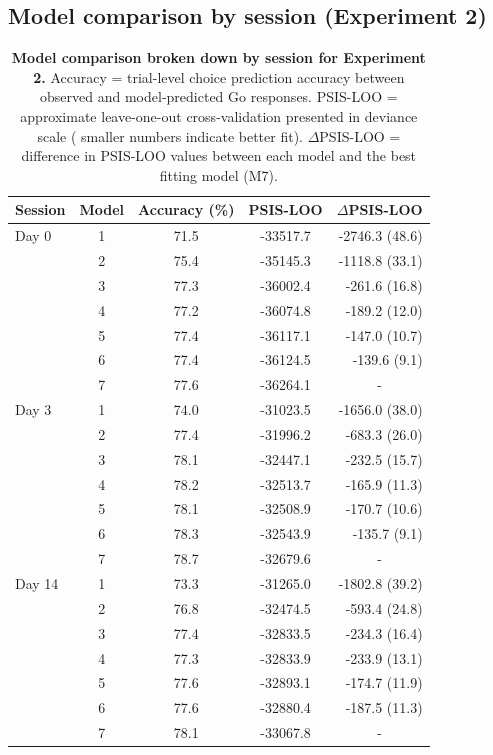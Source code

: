\documentclass[a4paper,12pt]{article}
\begin{document}
\begin{refsection}[supp]
\clearpage
\subsection*{Model comparison by session (Experiment 2)}

\begin{table}[h]
    \centering
    \begin{tabular}{lcccr}
        \toprule
        Session & Model & Accuracy (\%) & PSIS-LOO & \multicolumn{1}{c}{$\Delta$PSIS-LOO} \\
        \midrule
         Day 0 & 1 & 71.5 & -33517.7 & -2746.3 (48.6) \\
         & 2 & 75.4 & -35145.3 & -1118.8 (33.1) \\
         & 3 & 77.3 & -36002.4 & -261.6 (16.8) \\
         & 4 & 77.2 & -36074.8 & -189.2 (12.0) \\
         & 5 & 77.4 & -36117.1 & -147.0 (10.7) \\
         & 6 & 77.4 & -36124.5 & -139.6 (9.1) \\
         & 7 & 77.6 & -36264.1 & \multicolumn{1}{c}{-} \\
         \midrule
         Day 3 & 1 & 74.0 & -31023.5 & -1656.0 (38.0) \\
         & 2 & 77.4 & -31996.2 & -683.3 (26.0) \\
         & 3 & 78.1 & -32447.1 & -232.5 (15.7) \\
         & 4 & 78.2 & -32513.7 & -165.9 (11.3) \\
         & 5 & 78.1 & -32508.9 & -170.7 (10.6) \\
         & 6 & 78.3 & -32543.9 & -135.7 (9.1) \\
         & 7 & 78.7 & -32679.6 & \multicolumn{1}{c}{-} \\
         \midrule
         Day 14 & 1 & 73.3 & -31265.0 & -1802.8 (39.2) \\
         & 2 & 76.8 & -32474.5 & -593.4 (24.8) \\
         & 3 & 77.4 & -32833.5 & -234.3 (16.4) \\
         & 4 & 77.3 & -32833.9 & -233.9 (13.1) \\
         & 5 & 77.6 & -32893.1 & -174.7 (11.9) \\
         & 6 & 77.6 & -32880.4 & -187.5 (11.3) \\
         & 7 & 78.1 & -33067.8 & \multicolumn{1}{c}{-} \\
         \bottomrule
    \end{tabular}
    \caption{{\bf Model comparison broken down by session for Experiment 2.} Accuracy = trial-level choice prediction accuracy between observed and model-predicted Go responses. PSIS-LOO = approximate leave-one-out cross-validation presented in deviance scale ( smaller numbers indicate better fit). \break $\Delta$PSIS-LOO = difference in PSIS-LOO values between each model and the best fitting model (M7).}
    \label{tab:exp2_mc_full}
\end{table}
\end{refsection}

\end{document}
